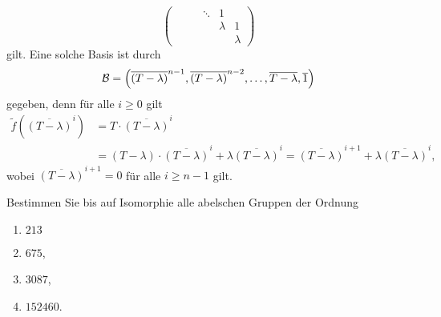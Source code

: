 \begin{solution}
\begin{enumerate}
\[\begin{pmatrix}
                  &         &         & \ddots  & 1       &         \\
                  &         &         &         & \lambda & 1       \\
                  &         &         &         &         & \lambda 
        \end{pmatrix}
      \]
      gilt.
      Eine solche Basis ist durch
      \[
          \mathcal{B}
        = \left( \overline{(T - \lambda)}^{n-1}, \overline{(T - \lambda)}^{n-2}, \dotsc, \overline{T - \lambda}, \overline{1} \right)
      \]
      gegeben, denn für alle $i \geq 0$ gilt
      \begin{align*}
            \tilde{f}\left( \overline{(T-\lambda)}^i \right)
        &=  T \cdot \overline{(T-\lambda)}^i
        \\
        &=  (T-\lambda) \cdot \overline{(T-\lambda)}^i + \lambda \overline{(T-\lambda)}^i
         =  \overline{(T-\lambda)}^{i+1} + \lambda \overline{(T-\lambda)}^i,
      \end{align*}
      wobei $\overline{(T-\lambda)}^{i+1} = 0$ für alle $i \geq n-1$ gilt.
  \end{enumerate}
\end{solution}


\begin{question}[subtitle = Abelsche Gruppen endlicher Ordnung]
  Bestimmen Sie bis auf Isomorphie alle abelschen Gruppen der Ordnung
  \begin{enumerate}
    \item
      $213$
    \item
      $675$,
    \item
      $3087$,
    \item
      $152460$.
  \end{enumerate}
\end{question}


